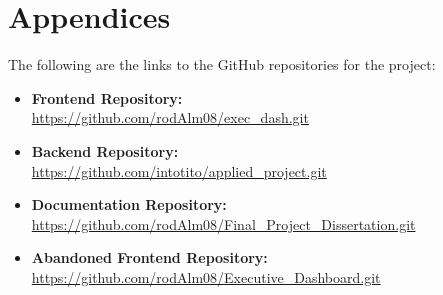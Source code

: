 \chapter{Appendices}

\label{appendix}



\label{sec:github-links}

The following are the links to the GitHub repositories for the project:

\begin{itemize}
    \item \textbf{Frontend Repository:} \\ \url{https://github.com/rodAlm08/exec_dash.git}
    \item \textbf{Backend Repository:} \\ \url{https://github.com/intotito/applied_project.git}
    \item \textbf{Documentation Repository:} \\ \url{https://github.com/rodAlm08/Final_Project_Dissertation.git}
    \item \textbf{Abandoned Frontend Repository:} \\ \url{https://github.com/rodAlm08/Executive_Dashboard.git}
\end{itemize}




\label{sec:ethics-application}





\label{sec:form-recruitment}

